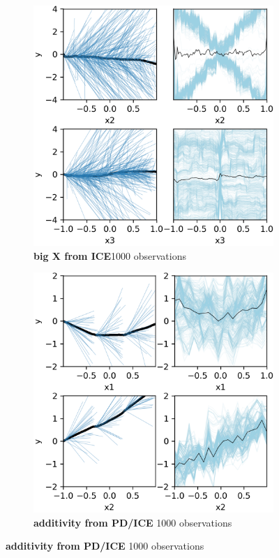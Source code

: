 \documentclass[12pt]{article}
\begin{document}
\begin{figure}[htbp]
\begin{subfigure}[h]{0.495\textwidth}
\includegraphics[scale=0.7]{images/bigx.png}
\caption{{\bf big X from ICE}1000 observations}
\label{fig:bigx_stratpd}
\end{subfigure}
\begin{subfigure}[h]{0.495\textwidth}
\includegraphics[scale=0.7]{images/additivity.png}
\caption{{\bf additivity from PD/ICE} 1000 observations}
\label{fig:additivity_stratpd}
\end{subfigure}
\end{figure}
\end{document}
